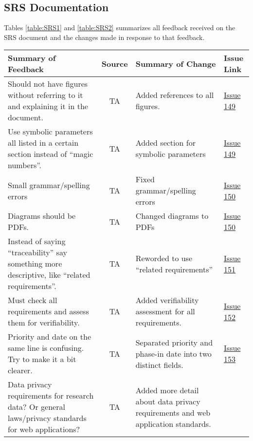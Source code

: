\documentclass{article}
\begin{document}
\subsection{SRS Documentation}
Tables \ref{table:SRS1} and \ref{table:SRS2} summarizes all feedback received on
the SRS document and the changes made in response to that feedback.
\begin{table}[H]
\centering
\begin{tabularx}{\textwidth}{|X|c|X|p{1cm}|}
    \hline
    \textbf{Summary of Feedback} & \textbf{Source} & \textbf{Summary of Change} &
    \textbf{Issue Link} \\
    \hline
    Should not have figures without referring to it and explaining it in the
    document. & TA & Added references to all figures. &
    \href{https://github.com/SumanyaG/Alkalytics/issues/149}{Issue 149} \\
    \hline
    Use symbolic parameters all listed in a certain section instead of ``magic
    numbers''. & TA & Added section for symbolic parameters &
    \href{https://github.com/SumanyaG/Alkalytics/issues/149}{Issue 149} \\
    \hline
    Small grammar/spelling errors & TA & Fixed grammar/spelling errors &
    \href{https://github.com/SumanyaG/Alkalytics/issues/150}{Issue 150} \\
    \hline
    Diagrams should be PDFs. & TA & Changed diagrams to PDFs
    & \href{https://github.com/SumanyaG/Alkalytics/issues/150}{Issue 150} \\
    \hline
    Instead of saying ``traceability'' say something more descriptive, like
    ``related requirements''. & TA & Reworded to use ``related requirements'' &
    \href{https://github.com/SumanyaG/Alkalytics/issues/151}{Issue 151} \\
    \hline
    Must check all requirements and assess them for verifiability. & TA & Added
    verifiability assessment for all requirements. &
    \href{https://github.com/SumanyaG/Alkalytics/issues/152}{Issue 152} \\
    \hline
    Priority and date on the same line is confusing. Try to make it a bit
    clearer. & TA & Separated priority and phase-in date into two distinct
    fields. & \href{https://github.com/SumanyaG/Alkalytics/issues/153}{Issue
    153} \\
    \hline
    Data privacy requirements for research data? Or general laws/privacy
    standards for web applications? & TA & Added more detail about data privacy
    requirements and web application standards. &

\end{tabularx}
\end{table}
\end{document}
